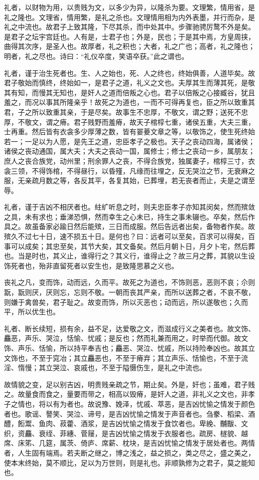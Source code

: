 \documentclass[]{article}
\begin{document}
礼者，以财物为用，以贵贱为文，以多少为异，以隆杀为要。文理繁，情用省，是礼之隆也。文理省，情用繁，是礼之杀也。文理情用相为内外表墨，并行而杂，是礼之中流也。故君子上致其隆，下尽其杀，而中处其中。步骤驰骋厉鹜不外是矣。是君子之坛宇宫廷也。人有是，士君子也；外是，民也；于是其中焉，方皇周挟，曲得其次序，是圣人也。故厚者，礼之积也；大者，礼之广也；高者，礼之隆也；明者，礼之尽也。诗曰：``礼仪卒度，笑语卒获。''此之谓也。

礼者，谨于治生死者也。生、人之始也，死、人之终也，终始俱善，人道毕矣。故君子敬始而慎终，终始如一，是君子之道，礼义之文也。夫厚其生而薄其死，是敬其有知，而慢其无知也，是奸人之道而倍叛之心也。君子以倍叛之心接臧谷，犹且羞之，而况以事其所隆亲乎！故死之为道也，一而不可得再复也，臣之所以致重其君，子之所以致重其亲，于是尽矣。故事生不忠厚，不敬文，谓之野；送死不忠厚，不敬文，谓之瘠。君子贱野而羞瘠，故天子棺椁七重，诸侯五重，大夫三重，士再重。然后皆有衣衾多少厚薄之数，皆有翣菨文章之等，以敬饰之，使生死终始若一；一足以为人愿，是先王之道，忠臣孝子之极也。天子之丧动四海，属诸侯；诸侯之丧动通国，属大夫；大夫之丧动一国，属修士；修士之丧动一乡，属朋友；庶人之丧合族党，动州里；刑余罪人之丧，不得合族党，独属妻子，棺椁三寸，衣衾三领，不得饰棺，不得昼行，以昏殣，凡缘而往埋之，反无哭泣之节，无衰麻之服，无亲疏月数之等，各反其平，各复其始，已葬埋，若无丧者而止，夫是之谓至辱。

礼者，谨于吉凶不相厌者也。紸纩听息之时，则夫忠臣孝子亦知其闵矣，然而殡敛之具，未有求也；垂涕恐惧，然而幸生之心未已，持生之事未辍也。卒矣，然后作具之。故虽备家必踰日然后能殡，三日而成服。然后告远者出矣，备物者作矣。故殡久不过七十日，速不损五十日。是何也？曰：远者可以至矣，百求可以得矣，百事可以成矣；其忠至矣，其节大矣，其文备矣。然后月朝卜日，月夕卜宅，然后葬也。当是时也，其义止，谁得行之？其义行，谁得止之？故三月之葬，其貌以生设饰死者也，殆非直留死者以安生也，是致隆思慕之义也。

丧礼之凡，变而饰，动而远，久而平。故死之为道也，不饰则恶，恶则不哀；尒则翫，翫则厌，厌则忘，忘则不敬。一朝而丧其严亲，而所以送葬之者，不哀不敬，则嫌于禽兽矣，君子耻之。故变而饰，所以灭恶也；动而远，所以遂敬也；久而平，所以优生也。

礼者、断长续短，损有余，益不足，达爱敬之文，而滋成行义之美者也。故文饰、麤恶，声乐、哭泣，恬愉、忧戚；是反也；然而礼兼而用之，时举而代御。故文饰、声乐、恬愉，所以持平奉吉也；麤恶、哭泣、忧戚，所以持险奉凶也。故其立文饰也，不至于窕冶；其立麤恶也，不至于瘠弃；其立声乐、恬愉也，不至于流淫、惰慢；其立哭泣、哀戚也，不至于隘慑伤生，是礼之中流也。

故情貌之变，足以别吉凶，明贵贱亲疏之节，期止矣。外是，奸也；虽难，君子贱之。故量食而食之，量要而带之，相高以毁瘠，是奸人之道，非礼义之文也，非孝子之情也，将以有为者也。故说豫、娩泽，忧戚、萃恶，是吉凶忧愉之情发于颜色者也。歌谣、謷笑、哭泣、谛号，是吉凶忧愉之情发于声音者也。刍豢、稻梁、酒醴，餰鬻、鱼肉、菽藿、酒浆，是吉凶忧愉之情发于食饮者也。卑絻、黼黻、文织，资麤、衰绖、菲繐、菅屦，是吉凶忧愉之情发于衣服者也。疏房、檖貌、越席、床笫、几筵，属茨、倚庐、席薪、枕块，是吉凶忧愉之情发于居处者也。两情者，人生固有端焉。若夫断之继之，博之浅之，益之损之，类之尽之，盛之美之，使本末终始，莫不顺比，足以为万世则，则是礼也。非顺孰修为之君子，莫之能知也。
\end{document}

